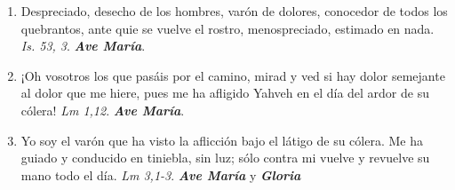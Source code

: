 \documentclass[../../devocionario.tex]{subfiles}
\begin{document}
\begin{enumerate}
            \item Despreciado, desecho de los hombres, varón de dolores, conocedor de todos los quebrantos, ante quie se vuelve el rostro, menospreciado, estimado en nada. 
            \emph{Is. 53, 3}. \textbf{\emph{Ave María}}.

        \item ¡Oh vosotros los que pasáis por el camino, mirad y ved si hay dolor semejante al dolor que me hiere, 
            pues me ha afligido Yahveh en el día del ardor de su cólera! \emph{Lm 1,12}. \textbf{\emph{Ave María}}.

        \item Yo soy el varón que ha visto la aflicción bajo el látigo de su cólera. Me ha guiado y conducido en tiniebla, 
            sin luz; sólo contra mi vuelve y revuelve su mano todo el día. \emph{Lm 3,1-3}. \textbf{\emph{Ave María}} y \textbf{\emph{Gloria}}

    \end{enumerate}
\end{document}
